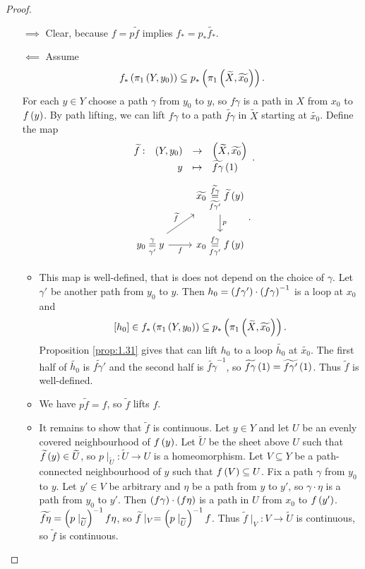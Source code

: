 \pagebreak

\begin{proof}
\hfill
\begin{itemize}
\item[$ \implies $] Clear, because $ f = p\widetilde{f} $ implies $ f_* = p_*\widetilde{f_*} $.
\item[$ \impliedby $] Assume
$$ f_*\left( \pi_1\left( Y, y_0 \right) \right) \subseteq p_*\left( \pi_1\left( \widetilde{X}, \widetilde{x_0} \right) \right). $$
For each $ y \in Y $ choose a path $ \gamma $ from $ y_0 $ to $ y $, so $ f\gamma $ is a path in $ X $ from $ x_0 $ to $ f\left( y \right) $. By path lifting, we can lift $ f\gamma $ to a path $ \widetilde{f\gamma} $ in $ \widetilde{X} $ starting at $ \widetilde{x_0} $. Define the map
$$ \function[\widetilde{f}]{\rb{Y, y_0}}{\rb{\widetilde{X}, \widetilde{x_0}}}{y}{\widetilde{f\gamma}\rb{1}}. $$
$$
\begin{tikzcd}
& \widetilde{x_0} \underset{\widetilde{f\gamma'}}{\overset{\widetilde{f\gamma}}{=}} \widetilde{f}\rb{y} \arrow{d}{p} \\
y_0 \underset{\gamma'}{\overset{\gamma}{=}} y \arrow{ur}{\widetilde{f}} \arrow[swap]{r}{f} & x_0 \underset{f\gamma'}{\overset{f\gamma}{=}} f\rb{y}
\end{tikzcd}.
$$
\begin{itemize}
\item This map is well-defined, that is does not depend on the choice of $ \gamma $. Let $ \gamma' $ be another path from $ y_0 $ to $ y $. Then $ h_0 = \left( f\gamma' \right) \cdot \left( f\gamma \right)^{-1} $ is a loop at $ x_0 $ and
$$ \left[ h_0 \right] \in f_*\left( \pi_1\left( Y, y_0 \right) \right) \subseteq p_*\left( \pi_1\left( \widetilde{X}, \widetilde{x_0} \right) \right). $$
Proposition \ref{prop:1.31} gives that can lift $ h_0 $ to a loop $ \widetilde{h_0} $ at $ \widetilde{x_0} $. The first half of $ \widetilde{h_0} $ is $ \widetilde{f\gamma'} $ and the second half is $ \widetilde{f\gamma}^{-1} $, so $ \widetilde{f\gamma}\left( 1 \right) = \widetilde{f\gamma'}\left( 1 \right) $. Thus $ \widetilde{f} $ is well-defined.
\item We have $ p\widetilde{f} = f $, so $ \widetilde{f} $ lifts $ f $.
\item It remains to show that $ \widetilde{f} $ is continuous. Let $ y \in Y $ and let $ U $ be an evenly covered neighbourhood of $ f\left( y \right) $. Let $ \widetilde{U} $ be the sheet above $ U $ such that $ \widetilde{f}\left( y \right) \in \widetilde{U} $, so $ p \mid_{\widetilde{U}} : \widetilde{U} \to U $ is a homeomorphism. Let $ V \subseteq Y $ be a path-connected neighbourhood of $ y $ such that $ f\left( V \right) \subseteq U $. Fix a path $ \gamma $ from $ y_0 $ to $ y $. Let $ y' \in V $ be arbitrary and $ \eta $ be a path from $ y $ to $ y' $, so $ \gamma \cdot \eta $ is a path from $ y_0 $ to $ y' $. Then $ \left( f\gamma \right) \cdot \left( f\eta \right) $ is a path in $ U $ from $ x_0 $ to $ f\left( y' \right) $. $ \widetilde{f\eta} = \left( p \mid_{\widetilde{U}} \right)^{-1}f\eta $, so $ \widetilde{f} \mid_V = \left( p \mid_{\widetilde{U}} \right)^{-1}f $. Thus $ \widetilde{f} \mid_V : V \to \widetilde{U} $ is continuous, so $ \widetilde{f} $ is continuous.
\end{itemize}
\end{itemize}
\end{proof}

